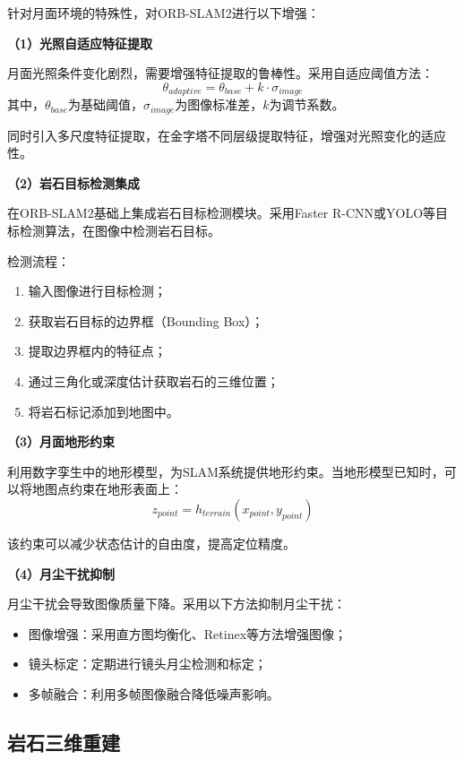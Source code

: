 针对月面环境的特殊性，对ORB-SLAM2进行以下增强：

\textbf{（1）光照自适应特征提取}

月面光照条件变化剧烈，需要增强特征提取的鲁棒性。采用自适应阈值方法：
\begin{equation}
    \theta_{adaptive} = \theta_{base} + k \cdot \sigma_{image}
    \label{eq:adaptive_threshold}
\end{equation}
其中，$\theta_{base}$为基础阈值，$\sigma_{image}$为图像标准差，$k$为调节系数。

同时引入多尺度特征提取，在金字塔不同层级提取特征，增强对光照变化的适应性。

\textbf{（2）岩石目标检测集成}

在ORB-SLAM2基础上集成岩石目标检测模块。采用Faster R-CNN\cite{ref49}或YOLO\cite{ref50}等目标检测算法，在图像中检测岩石目标。

检测流程：
\begin{enumerate}
    \item 输入图像进行目标检测；
    \item 获取岩石目标的边界框（Bounding Box）；
    \item 提取边界框内的特征点；
    \item 通过三角化或深度估计获取岩石的三维位置；
    \item 将岩石标记添加到地图中。
\end{enumerate}

\textbf{（3）月面地形约束}

利用数字孪生中的地形模型，为SLAM系统提供地形约束。当地形模型已知时，可以将地图点约束在地形表面上：
\begin{equation}
    z_{point} = h_{terrain}(x_{point}, y_{point})
    \label{eq:terrain_constraint}
\end{equation}

该约束可以减少状态估计的自由度，提高定位精度。

\textbf{（4）月尘干扰抑制}

月尘干扰会导致图像质量下降。采用以下方法抑制月尘干扰：
\begin{itemize}
    \item 图像增强：采用直方图均衡化、Retinex等方法增强图像；
    \item 镜头标定：定期进行镜头月尘检测和标定；
    \item 多帧融合：利用多帧图像融合降低噪声影响。
\end{itemize}

\subsection{岩石三维重建}
\label{subsec:rock_reconstruction}

